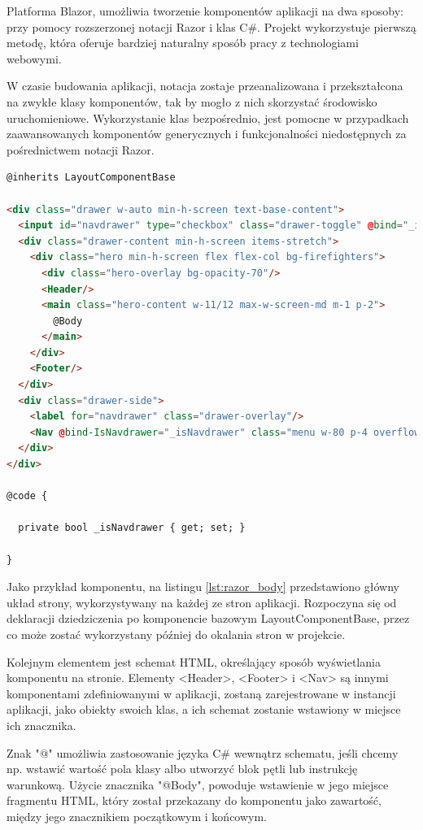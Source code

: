 Platforma Blazor, umożliwia tworzenie komponentów aplikacji na dwa sposoby: przy pomocy rozszerzonej notacji Razor i klas C\#. Projekt wykorzystuje pierwszą metodę, która oferuje bardziej naturalny sposób pracy z technologiami webowymi. 

W czasie budowania aplikacji, notacja zostaje przeanalizowana i przekształcona na zwykłe klasy komponentów, tak by mogło z nich skorzystać środowisko uruchomieniowe. Wykorzystanie klas bezpośrednio, jest pomocne w przypadkach zaawansowanych komponentów generycznych i funkcjonalności niedostępnych za pośrednictwem notacji Razor.

\begin{lstlisting}[language=HTML, caption={Przykładowy komponent Razor, opisujący główny układ strony}, label=lst:razor_body]
@inherits LayoutComponentBase

<div class="drawer w-auto min-h-screen text-base-content">
  <input id="navdrawer" type="checkbox" class="drawer-toggle" @bind="_isNavdrawer"/>
  <div class="drawer-content min-h-screen items-stretch">
    <div class="hero min-h-screen flex flex-col bg-firefighters">
      <div class="hero-overlay bg-opacity-70"/>
      <Header/>
      <main class="hero-content w-11/12 max-w-screen-md m-1 p-2">
        @Body
      </main>
    </div>
    <Footer/>
  </div>
  <div class="drawer-side">
    <label for="navdrawer" class="drawer-overlay"/>
    <Nav @bind-IsNavdrawer="_isNavdrawer" class="menu w-80 p-4 overflow-y-auto bg-base-300 bg-opacity-90"/>
  </div>
</div>

@code {

  private bool _isNavdrawer { get; set; }

}
\end{lstlisting}

Jako przykład komponentu, na listingu \ref{lst:razor_body} przedstawiono główny układ strony, wykorzystywany na każdej ze stron aplikacji. Rozpoczyna się od deklaracji dziedziczenia po komponencie bazowym LayoutComponentBase, przez co może zostać wykorzystany później do okalania stron w projekcie.

Kolejnym elementem jest schemat HTML, określający sposób wyświetlania komponentu na stronie. Elementy <Header>, <Footer> i <Nav> są innymi komponentami zdefiniowanymi w aplikacji, zostaną zarejestrowane w instancji aplikacji, jako obiekty swoich klas, a ich schemat zostanie wstawiony w miejsce ich znacznika. 

Znak "@" umożliwia zastosowanie języka C\# wewnątrz schematu, jeśli chcemy np. wstawić wartość pola klasy albo utworzyć blok pętli lub instrukcję warunkową. Użycie znacznika "@Body", powoduje wstawienie w jego miejsce fragmentu HTML, który został przekazany do komponentu jako zawartość, między jego znacznikiem początkowym i końcowym. 

